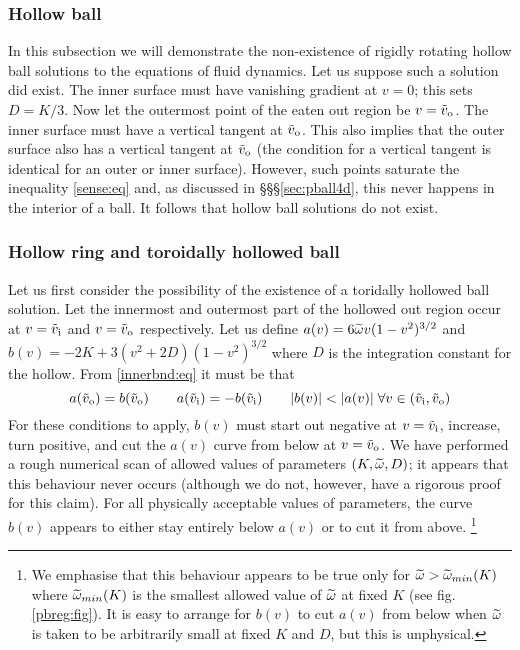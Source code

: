 \subsubsection{Hollow ball}\label{sec:hball}


In this subsection we will demonstrate the non-existence of rigidly
rotating hollow ball solutions to the equations of fluid dynamics.
Let us suppose such a solution did exist. The inner surface must
have vanishing gradient at $v=0$; this sets $D=K/3$. Now let the
outermost point of the eaten out region be $v=\tilde{v}_\mathrm{o}$. The inner
surface must have a vertical tangent at $\tilde{v}_\mathrm{o}$. This also implies
that the outer surface also has a vertical tangent at $\tilde{v}_\mathrm{o}$ (the
condition for a vertical tangent is identical for an outer or inner
surface). However, such points saturate the inequality
\eqref{sense:eq} and, as discussed in \S\S\S\ref{sec:pball4d}, this
never happens in the interior of a ball. It follows that hollow ball
solutions do not exist.



\subsubsection{Hollow ring and toroidally hollowed ball}\label{sec:hring}

Let us first consider the possibility of the existence of a toridally hollowed ball
solution. Let the innermost and outermost part of the hollowed out region occur at
$v=\tilde{v}_\mathrm{i}$ and  $v=\tilde{v}_\mathrm{o}$ respectively. Let us define $a(v)= 6 \widetilde{\omega} v(1-v^2)^{{3/2}}$
and $b(v)=-2K+3(v^2+2D)(1-v^2)^{{3/2}}$ where $D$ is the integration constant for
the hollow. From \eqref{innerbnd:eq} it must be that
%
\begin{equation*}
  a(\vot)=b(\vot)\qquad
  a(\vit)=-b(\vit)\qquad
  |b(v)|<|a(v)|\; \forall   v \in (\vit, \vot)
\end{equation*}
%
For these conditions to apply, $b(v)$ must start out negative at $v=\tilde{v}_\mathrm{i}$, increase, turn positive, and cut the $a(v)$ curve from below at $v=\tilde{v}_\mathrm{o}$. We have performed a rough numerical scan of allowed values of parameters $(K, \widetilde{\omega}, D)$; it appears that this behaviour never occurs 
(although we do not, however, have a rigorous proof for this claim). For all physically 
acceptable values of parameters, the curve $b(v)$ appears to either stay entirely below 
$a(v)$ or to cut it from above. \footnote{We emphasise that this behaviour appears to be true only for $\widetilde{\omega}>\widetilde{\omega}_{min}(K)$ where $\widetilde{\omega}_{min}(K)$ is the smallest allowed value of $\widetilde{\omega}$ at fixed
$K$ (see fig.\ref{pbreg:fig}).  It is easy to arrange for $b(v)$ to cut $a(v)$ from below 
when $\widetilde{\omega}$ is taken to be arbitrarily small at fixed $K$ and $D$, but this is unphysical.}

